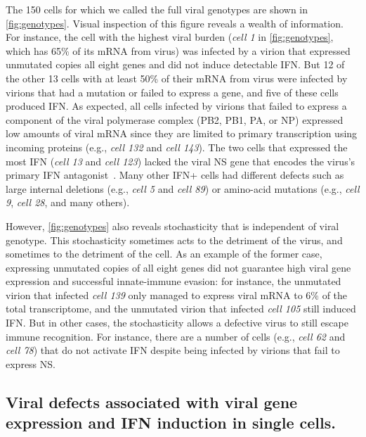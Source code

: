 \documentclass[]{asm-article}
\newcommand{\FIG}[1]{\autoref{fig:#1}}
\begin{document}
The 150 cells for which we called the full viral genotypes are shown in \FIG{genotypes}.
Visual inspection of this figure reveals a wealth of information.
For instance, the cell with the highest viral burden (\textit{cell 1} in \FIG{genotypes}, which has 65\% of its mRNA from virus) was infected by a virion that expressed unmutated copies all eight genes and did not induce detectable IFN.
But 12 of the other 13 cells with at least 50\% of their mRNA from virus were infected by virions that had a mutation or failed to express a gene, and five of these cells produced IFN.
As expected, all cells infected by virions that failed to express a component of the viral polymerase complex (PB2, PB1, PA, or NP) expressed low amounts of viral mRNA since they are limited to primary transcription using incoming proteins (e.g., \textit{cell 132} and \textit{cell 143}).
The two cells that expressed the most IFN (\textit{cell 13} and \textit{cell 123}) lacked the viral NS gene that encodes the virus's primary IFN antagonist~\cite{garcia1998influenza, hale2008multifunctional}.
Many other IFN+ cells had different defects such as large internal deletions (e.g., \textit{cell 5} and \textit{cell 89}) or amino-acid mutations (e.g., \textit{cell 9}, \textit{cell 28}, and many others).

However, \FIG{genotypes} also reveals stochasticity that is independent of viral genotype.
This stochasticity sometimes acts to the detriment of the virus, and sometimes to the detriment of the cell.
As an example of the former case, expressing unmutated copies of all eight genes did not guarantee high viral gene expression and successful innate-immune evasion: for instance, the unmutated virion that infected \textit{cell 139} only managed to express viral mRNA to 6\% of the total transcriptome, and the unmutated virion that infected \textit{cell 105} still induced IFN.
But in other cases, the stochasticity allows a defective virus to still escape immune recognition.
For instance, there are a number of cells (e.g., \textit{cell 62} and \textit{cell 78}) that do not activate IFN despite being infected by virions that fail to express NS.

\subsection{Viral defects associated with viral gene expression and IFN induction in single cells.}
\end{document}
